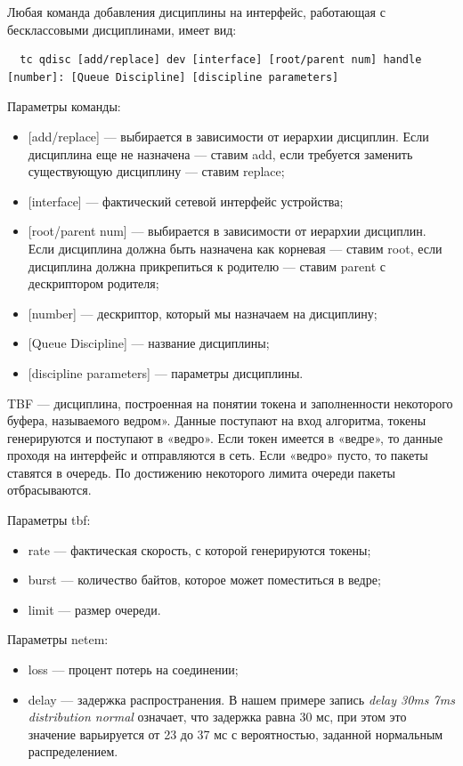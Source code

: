 \documentclass[
  13pt,
  fontsize=13pt,
  russian,
  a4paper,
,captions=tableheading
]{scrreprt}
\providecommand{\tightlist}{%
  \setlength{\itemsep}{0pt}\setlength{\parskip}{0pt}}
\begin{document}
Любая команда добавления дисциплины на интерфейс, работающая с
бесклассовыми дисциплинами, имеет вид:

\begin{verbatim}
  tc qdisc [add/replace] dev [interface] [root/parent num] handle [number]: [Queue Discipline] [discipline parameters]
  \end{verbatim}

Параметры команды:

\begin{itemize}
\tightlist
\item
  {[}add/replace{]} --- выбирается в зависимости от иерархии дисциплин.
  Если дисциплина еще не назначена --- ставим add, если требуется
  заменить существующую дисциплину --- ставим replace;
\item
  {[}interface{]} --- фактический сетевой интерфейс устройства;
\item
  {[}root/parent num{]} --- выбирается в зависимости от иерархии
  дисциплин. Если дисциплина должна быть назначена как корневая ---
  ставим root, если дисциплина должна прикрепиться к родителю --- ставим
  parent с дескриптором родителя;
\item
  {[}number{]} --- дескриптор, который мы назначаем на дисциплину;
\item
  {[}Queue Discipline{]} --- название дисциплины;
\item
  {[}discipline parameters{]} --- параметры дисциплины.
\end{itemize}

TBF --- дисциплина, построенная на понятии токена и заполненности
некоторого буфера, называемого ведром». Данные поступают на вход
алгоритма, токены генерируются и поступают в «ведро». Если токен имеется
в «ведре», то данные проходя на интерфейс и отправляются в сеть. Если
«ведро» пусто, то пакеты ставятся в очередь. По достижению некоторого
лимита очереди пакеты отбрасываются.

Параметры tbf:

\begin{itemize}
\tightlist
\item
  rate --- фактическая скорость, с которой генерируются токены;
\item
  burst --- количество байтов, которое может поместиться в ведре;
\item
  limit --- размер очереди.
\end{itemize}

Параметры netem:

\begin{itemize}
\tightlist
\item
  loss --- процент потерь на соединении;
\item
  delay --- задержка распространения. В нашем примере запись \emph{delay
  30ms 7ms distribution normal} означает, что задержка равна 30 мс, при
  этом это значение варьируется от 23 до 37 мс с вероятностью, заданной
  нормальным распределением.
\end{itemize}
\end{document}
